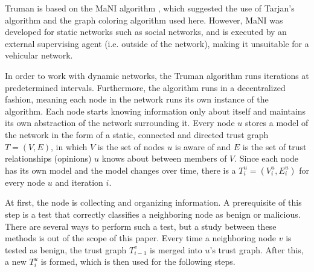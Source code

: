 \documentclass[conference]{IEEEtran}
\begin{document}
Truman is based on the MaNI algorithm \cite{vernize2015malicious}, which suggested the use of Tarjan's algorithm and the graph coloring algorithm used here.
However, MaNI was developed for static networks such as social networks, and is executed by an external supervising agent (i.e. outside of the network), making it unsuitable for a vehicular network.


In order to work with dynamic networks, the Truman algorithm runs iterations at predetermined intervals.
Furthermore, the algorithm runs in a decentralized fashion, meaning each node in the network runs its own instance of the algorithm.
Each node starts knowing information only about itself and maintains its own abstraction of the network surrounding it.
Every node $u$ stores a model of the network in the form of a static, connected and directed trust graph $T = (V, E)$, in which $V$ is the set of nodes $u$ is aware of and $E$ is the set of trust relationships (opinions) $u$ knows about between members of $V$.
Since each node has its own model and the model changes over time, there is a $T^u_i = (V^u_i, E^u_i)$ for every node $u$ and iteration $i$.



At first, the node is collecting and organizing information.
A prerequisite of this step is a test that correctly classifies a neighboring node as benign or malicious.
There are several ways to perform such a test, but a study between these methods is out of the scope of this paper.
Every time a neighboring node $v$ is tested as benign, the trust graph $T^v_{i-1}$ is merged into $u$'s trust graph.
After this, a new $T^u_i$ is formed, which is then used for the following steps.
\end{document}
